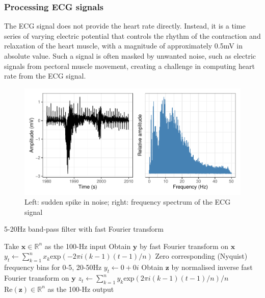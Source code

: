 \documentclass[
]{article}
\begin{document}
\hypertarget{processing-ecg-signals}{%
\subsubsection{Processing ECG signals}\label{processing-ecg-signals}}

The ECG signal does not provide the heart rate directly. Instead, it is
a time series of varying electric potential that controls the rhythm of
the contraction and relaxation of the heart muscle, with a magnitude of
approximately 0.5mV in absolute value. Such a signal is often masked by
unwanted noise, such as electric signals from pectoral muscle movement,
creating a challenge in computing heart rate from the ECG signal.

\begin{figure}

{\centering \includegraphics{report_files/figure-latex/ecg-noise-1} 

}

\caption{Left: sudden spike in noise; right: frequency spectrum of the ECG signal}\label{fig:ecg-noise}
\end{figure}

\begin{algorithm}
\caption{5-20Hz band-pass filter with fast Fourier transform}
\begin{algorithmic}
\STATE Take $\mathbf{x} \in \mathbb{R}^n$ as the 100-Hz input
\STATE Obtain $\mathbf{y}$ by fast Fourier transform on $\mathbf{x}$
\STATE $y_t \leftarrow \sum_{k = 1}^n{x_k}\text{exp}(-2\pi i(k - 1)(t - 1) / n)$
\ENDFOR
\STATE Zero corresponding (Nyquist) frequency bins for 0-5, 20-50Hz
\STATE $y_t \leftarrow 0 + 0i$
\ENDFOR
\STATE Obtain $\mathbf{z}$ by normalised inverse fast Fourier transform on $\mathbf{y}$
\STATE $z_t \leftarrow \sum_{k = 1}^n{y_k}\text{exp}(2\pi i(k - 1)(t - 1) / n) / n$
\ENDFOR
\RETURN $\text{Re}(\mathbf{z}) \in \mathbb{R}^n$ as the 100-Hz output
\end{algorithmic}
\end{algorithm}
\end{document}
